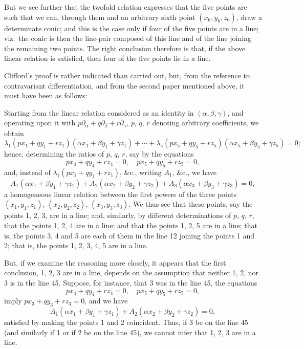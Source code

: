 \documentclass[11pt,a4paper]{article}
\begin{document}
But we see further that the twofold relation expresses that the five points are such that we can, through them and an arbitrary sixth point $(x_6, y_6, z_6)$, draw a determinate conic; and this is the case only if four of the five points are in a line; viz.\ the conic is then the line-pair composed of this line and of the line joining the remaining two points. The right conclusion therefore is that, if the above linear relation is satisfied, then four of the five points lie in a line.

Clifford's proof is rather indicated than carried out, but, from the reference to contravariant differentiation, and from the second paper mentioned above, it must have been as follows:

Starting from the linear relation considered as an identity in $(\alpha, \beta, \gamma)$, and operating upon it with $p \partial_\alpha + q \partial_\beta + r \partial_\gamma$, $p$, $q$, $r$ denoting arbitrary coefficients, we obtain
\[
\lambda_1 (p x_1 + q y_1 + r z_1)(\alpha x_1 + \beta y_1 + \gamma z_1) + \cdots + \lambda_5 (p x_5 + q y_5 + r z_5)(\alpha x_5 + \beta y_5 + \gamma z_5) = 0;
\]
hence, determining the ratios of $p$, $q$, $r$, say by the equations
\[
p x_4 + q y_4 + r z_4 = 0,\quad p x_5 + q y_5 + r z_5 = 0,
\]
and, instead of $\lambda_1 (p x_1 + q y_1 + r z_1)$, \&c., writing $A_1$, \&c., we have
\[
A_1 (\alpha x_1 + \beta y_1 + \gamma z_1) + A_2 (\alpha x_2 + \beta y_2 + \gamma z_2) + A_3 (\alpha x_3 + \beta y_3 + \gamma z_3) = 0,
\]
a homogeneous linear relation between the first powers of the three points $(x_1, y_1, z_1)$, $(x_2, y_2, z_2)$, $(x_3, y_3, z_3)$. We thus see that these points, say the points 1, 2, 3, are in a line; and, similarly, by different determinations of $p$, $q$, $r$, that the points 1, 2, 4 are in a line; and that the points 1, 2, 5 are in a line; that is, the points 3, 4 and 5 are each of them in the line 12 joining the points 1 and 2; that is, the points 1, 2, 3, 4, 5 are in a line.

But, if we examine the reasoning more closely, it appears that the first conclusion, 1, 2, 3 are in a line, depends on the assumption that neither 1, 2, nor 3 is in the line 45. Suppose, for instance, that 3 was in the line 45, the equations
\[
p x_4 + q y_4 + r z_4 = 0,\quad p x_5 + q y_5 + r z_5 = 0,
\]
imply $p x_3 + q y_3 + r z_3 = 0$, and we have
\[
A_1 (\alpha x_1 + \beta y_1 + \gamma z_1) + A_2 (\alpha x_2 + \beta y_2 + \gamma z_2) = 0,
\]
satisfied by making the points 1 and 2 coincident. Thus, if 3 be on the line 45 (and similarly if 1 or if 2 be on the line 45), we cannot infer that 1, 2, 3 are in a line.
\end{document}
